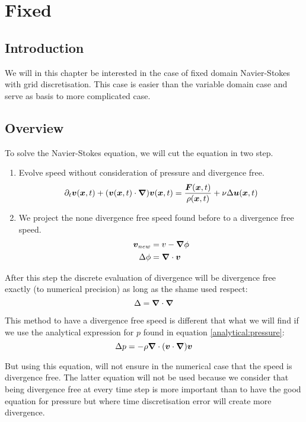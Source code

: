 \chapter{Fixed}
\minitoc
\section{Introduction}

We will in this chapter be interested in the case of fixed domain Navier-Stokes with grid discretisation.
This case is easier than the variable domain case and serve as basis to more complicated case.

\section{Overview}

To solve the Navier-Stokes equation, we will cut the equation in two step.
\begin{enumerate}
\item Evolve speed without consideration of pressure and divergence free.
  \begin{equation}
  \partial_t {\boldsymbol {v}}({\boldsymbol {x}} ,t)+({\boldsymbol {v}}({\boldsymbol {x}},t)\cdot{\boldsymbol {\nabla}} ) {\boldsymbol {v}}({\boldsymbol {x}} ,t)=\frac{{\boldsymbol {F}}({\boldsymbol {x}},t)}{\rho({\boldsymbol {x}},t)}+\nu \Delta {\boldsymbol {u}}({\boldsymbol {x}},t)
  \end{equation}
\item We project the none divergence free speed found before to a divergence free speed.
  \begin{align}
  {\boldsymbol {v}}_{new}&=v-{\boldsymbol {\nabla}}\phi\\
  \Delta \phi&={\boldsymbol {\nabla}} \cdot {\boldsymbol {v}}
  \end{align}
\end{enumerate}

After this step the discrete evaluation of divergence will be divergence free exactly (to numerical precision) as long as the shame used respect:
\begin{equation}
\Delta={\boldsymbol {\nabla}}\cdot {\boldsymbol {\nabla}}
\end{equation}

\begin{rem}
This method to have a divergence free speed is different that what we will find if we use the analytical expression for $p$ found in equation \ref{analytical:pressure}:
\begin{equation}
  \Delta p=-\rho {\boldsymbol {\nabla}} \cdot ({\boldsymbol {v}}\cdot {\boldsymbol {\nabla}}) {\boldsymbol {v}}
\end{equation}

But using this equation, will not ensure in the numerical case that the speed is divergence free.
The latter equation will not be used because we consider that being divergence free at every time step is more important than
to have the good equation for pressure but where time discretisation error will create more divergence.
\end{rem}

